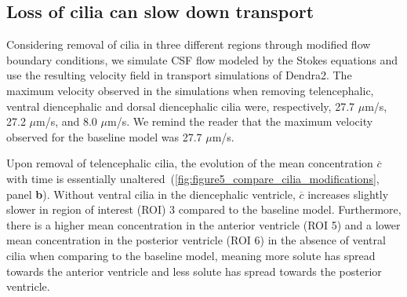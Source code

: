 \documentclass[fleqn]{wlscirep}
\begin{document}
\subsection*{Loss of cilia can slow down transport}
Considering removal of cilia in three different regions through modified flow boundary conditions, we simulate CSF flow modeled by the Stokes equations and use the resulting velocity field in transport simulations of Dendra2. The maximum velocity observed in the simulations when removing telencephalic, ventral diencephalic and dorsal diencephalic cilia were, respectively, 27.7 $\mu$m/s, 27.2 $\mu$m/s, and 8.0 $\mu$m/s. We remind the reader that the maximum velocity observed for the baseline model was 27.7 $\mu$m/s.

Upon removal of telencephalic cilia, the evolution of the mean concentration $\overline{c}$ with time is essentially unaltered~(\cref{fig:figure5_compare_cilia_modifications}, panel \textbf{b}). Without ventral cilia in the diencephalic ventricle, $\overline{c}$ increases slightly slower in region of interest (ROI) 3 compared to the baseline model. Furthermore, there is a higher mean concentration in the anterior ventricle (ROI 5) and a lower mean concentration in the posterior ventricle (ROI 6) in the absence of ventral cilia when comparing to the baseline model, meaning more solute has spread towards the anterior ventricle and less solute has spread towards the posterior ventricle.
\end{document}
